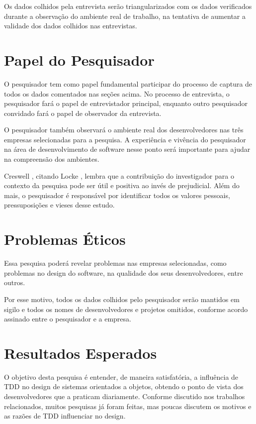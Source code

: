 Os dados colhidos pela entrevista serão triangularizados com os dados
verificados durante a observação do ambiente real de trabalho, na
tentativa de aumentar a validade dos dados colhidos nas entrevistas.

\section{Papel do Pesquisador}
\label{sec:planejamento-papel}

O pesquisador tem como papel fundamental participar do processo de  captura de
todos os dados comentados nas seções acima. No processo de entrevista, o 
pesquisador fará o papel de entrevistador principal, enquanto outro  pesquisador
convidado fará o papel de observador da entrevista.

O pesquisador também observará o ambiente real dos desenvolvedores nas três 
empresas selecionadas para a pesquisa. A experiência e vivência do pesquisador 
na área de desenvolvimento de software nesse ponto será importante para  ajudar
na compreensão dos ambientes.

Creswell \cite{creswell}, citando Locke \cite{locke}, lembra
que a contribuição do investigador para o contexto da pesquisa pode ser útil e
positiva ao invés de prejudicial. Além do mais, o pesquisador é responsável por
identificar todos os valores pessoais, pressuposições e vieses desse estudo.

\section{Problemas Éticos}
\label{sec:planejamento-etica}

Essa pesquisa poderá revelar problemas nas empresas selecionadas, como problemas
no design do software, na qualidade dos seus desenvolvedores, entre outros. 

Por esse motivo, todos os dados colhidos pelo pesquisador serão mantidos em
sigilo e todos os nomes de desenvolvedores e projetos omitidos, conforme acordo 
assinado entre o pesquisador e a empresa.

\section{Resultados Esperados}
\label{sec:planejamento-resultados-esperados}

O objetivo desta pesquisa é entender, de maneira satisfatória, a influência de 
TDD no design de sistemas orientados a objetos, obtendo o ponto de vista dos 
desenvolvedores que a praticam diariamente. Conforme discutido nos trabalhos 
relacionados, muitos pesquisas já foram feitas, mas poucas discutem os motivos 
e as razões de TDD influenciar no design.

